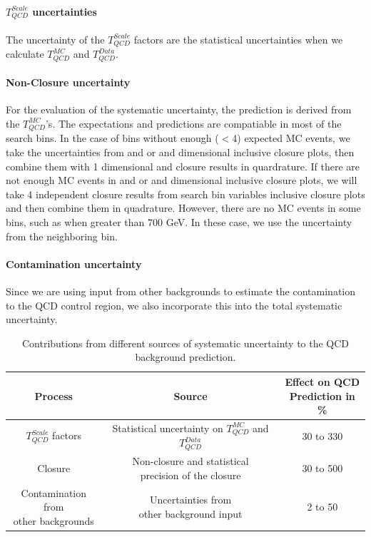 \paragraph{$T_{QCD}^{Scale}$ uncertainties}
The uncertainty of the $T_{QCD}^{Scale}$ factors are the statistical uncertainties when we calculate $T_{QCD}^{MC}$ and $T_{QCD}^{Data}$.

\paragraph{Non-Closure uncertainty}

For the evaluation of the systematic uncertainty, the prediction is 
derived from the $T_{QCD}^{MC}$'s. 
The expectations and predictions are compatiable in 
most of the search bins. In the case of bins without enough ($<4$) expected MC events,
we take the uncertainties from \MET and  \MTTwo or \MET and   dimensional inclusive closure plots, then combine them with 1 dimensional \ntops and \nbjets closure results in quardrature. If there are not enough MC events in \MET and  \MTTwo or \MET and   dimensional inclusive closure plots, we will take 4 independent closure results from search bin variables inclusive closure plots and then combine them in quadrature. However, there are no MC events in some bins, such as when \MET greater than 700 GeV. In these case, we use the uncertainty from the neighboring bin.

\paragraph{Contamination uncertainty}
Since we are using input from other backgrounds to estimate the contamination to the QCD control region, we also incorporate this into the total systematic uncertainty.

\begin{table}[htbp]
\fontsize{10 pt}{1.2 em}
\selectfont
\begin{centering}
\caption{\label{tab:QCDpredsys} Contributions from different sources of systematic uncertainty to the QCD background prediction.}
\hspace*{-4ex}
\begin{tabular}{|c|c|c|}
\hline
Process & Source & \specialcell{Effect on QCD \\ Prediction in \%} \\
\hline
$T_{QCD}^{Scale}$ factors & \specialcell{Statistical uncertainty \\ on $T_{QCD}^{MC}$ and $T_{QCD}^{Data}$} & 30 to 330 \\
\hline
Closure & \specialcell{Non-closure and statistical \\ precision of the closure} & 30 to 500 \\
\hline
\specialcell{Contamination from \\ other backgrounds} & \specialcell{Uncertainties from \\ other background input} & 2 to 50 \\
\hline
\end{tabular}
\par\end{centering}
\end{table}

